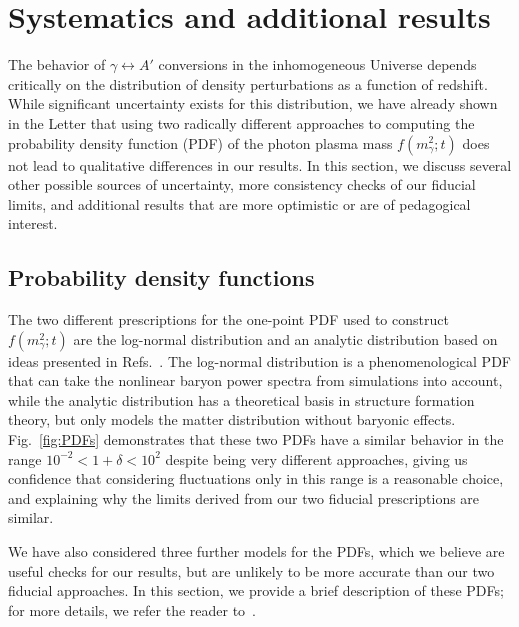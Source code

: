 \documentclass[prd,aps,10pt,nofootinbib,twocolumn,superscriptaddress,preprintnumbers,balancelastpage,longbibliography]{revtex4-1}
\begin{document}
\section{Systematics and additional results}
\label{app:systematics}

The behavior of $\gamma \leftrightarrow A'$ conversions in the inhomogeneous Universe depends critically on the distribution of density perturbations as a function of redshift. While significant uncertainty exists for this distribution, we have already shown in the Letter that using two radically different approaches to computing the probability density function (PDF) of the photon plasma mass $f(m_\gamma^2;t)$ does not lead to qualitative differences in our results. In this section, we discuss several other possible sources of uncertainty, more consistency checks of our fiducial limits, and additional results that are more optimistic or are of pedagogical interest. 

\subsection{Probability density functions}

The two different prescriptions for the one-point PDF used to construct $f(m_\gamma^2;t)$ are the log-normal distribution and an analytic distribution based on ideas presented in Refs.~\cite{Valageas:2001zr,Bernardeau:2015khs,Uhlemann:2015npz,BetancortRijo:2001ge,Lam:2007qw,Ivanov:2018lcg}. The log-normal distribution is a phenomenological PDF that can take the nonlinear baryon power spectra from simulations into account, while the analytic distribution has a theoretical basis in structure formation theory, but only models the matter distribution without baryonic effects. Fig.~\ref{fig:PDFs} demonstrates that these two PDFs have a similar behavior in the range $10^{-2} < 1 + \delta < 10^2$ despite being very different approaches, giving us confidence that considering fluctuations only in this range is a reasonable choice, and explaining why the limits derived from our two fiducial prescriptions are similar.

We have also considered three further models for the PDFs, which we believe are useful checks for our results, but are unlikely to be more accurate than our two fiducial approaches. In this section, we provide a brief description of these PDFs; for more details, we refer the reader to~.
\end{document}
